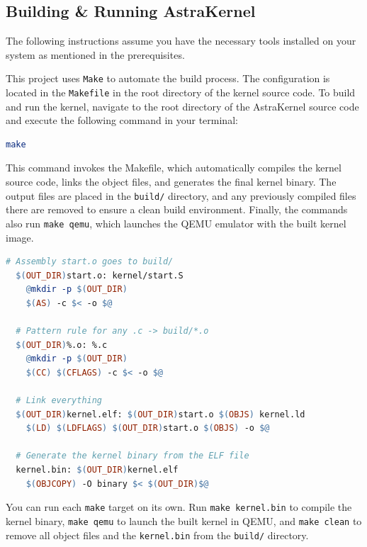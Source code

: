 \subsection{Building \& Running AstraKernel}

\begin{note}
  The following instructions assume you have the necessary tools installed on your 
  system as mentioned in the prerequisites.
\end{note}

This project uses \texttt{Make} to automate the build process. The configuration
is located in the \texttt{Makefile} in the root directory of the kernel source code.
To build and run the kernel, navigate to the root directory of the AstraKernel source code
and execute the following command in your terminal: \\

\begin{lstlisting}[language={bash}, caption={Building AstraKernel.}, label={lst:build}]
make
\end{lstlisting}

\noindent
This command invokes the Makefile, which automatically compiles the kernel 
source code, links the object files, and generates the final kernel binary. The 
output files are placed in the \texttt{build/} directory, and any previously 
compiled files there are removed to ensure a clean build environment. Finally, 
the commands also run \texttt{make qemu}, which launches the QEMU emulator with the 
built kernel image. \\

\begin{lstlisting}[language={make}, caption={Makefile for AstraKernel.}, label={lst:makefile}]
  # Assembly start.o goes to build/
  $(OUT_DIR)start.o: kernel/start.S
    @mkdir -p $(OUT_DIR)
    $(AS) -c $< -o $@

  # Pattern rule for any .c -> build/*.o
  $(OUT_DIR)%.o: %.c
    @mkdir -p $(OUT_DIR)
    $(CC) $(CFLAGS) -c $< -o $@

  # Link everything
  $(OUT_DIR)kernel.elf: $(OUT_DIR)start.o $(OBJS) kernel.ld
    $(LD) $(LDFLAGS) $(OUT_DIR)start.o $(OBJS) -o $@

  # Generate the kernel binary from the ELF file
  kernel.bin: $(OUT_DIR)kernel.elf
    $(OBJCOPY) -O binary $< $(OUT_DIR)$@
\end{lstlisting}

\begin{info}
  You can run each \texttt{make} target on its own. Run \texttt{make kernel.bin} 
  to compile the kernel binary, \texttt{make qemu} to launch the built kernel in 
  QEMU, and \texttt{make clean} to remove all object files and the \texttt{kernel.bin} 
  from the \texttt{build/} directory.
\end{info}

